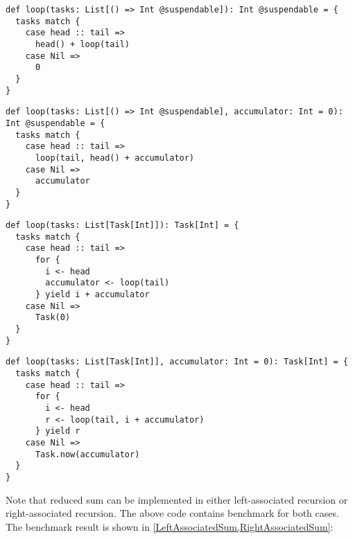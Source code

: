 \begin{lstlisting}[float=htbp,caption={Left-associated sum based on Scala Continuation plug-in},label={LeftAssociatedSum.scalaContinuation}]
def loop(tasks: List[() => Int @suspendable]): Int @suspendable = {
  tasks match {
    case head :: tail =>
      head() + loop(tail)
    case Nil =>
      0
  }
}
\end{lstlisting}

\begin{lstlisting}[float=htbp,caption={Right-associated sum based on Scala Continuation plug-in},label={RightAssociatedSum.scalaContinuation}]
def loop(tasks: List[() => Int @suspendable], accumulator: Int = 0): Int @suspendable = {
  tasks match {
    case head :: tail =>
      loop(tail, head() + accumulator)
    case Nil =>
      accumulator
  }
}
\end{lstlisting}

\begin{lstlisting}[float=htbp,caption={Left-associated sum based on \lstinline{for}-comprehension},label={LeftAssociatedSum.scalaz}]
def loop(tasks: List[Task[Int]]): Task[Int] = {
  tasks match {
    case head :: tail =>
      for {
        i <- head
        accumulator <- loop(tail)
      } yield i + accumulator
    case Nil =>
      Task(0)
  }
}
\end{lstlisting}

\begin{lstlisting}[float=htbp,caption={Right-associated sum based on \lstinline{for}-comprehension},label={RightAssociatedSum.scalaz}]
def loop(tasks: List[Task[Int]], accumulator: Int = 0): Task[Int] = {
  tasks match {
    case head :: tail =>
      for {
        i <- head
        r <- loop(tail, i + accumulator)
      } yield r
    case Nil =>
      Task.now(accumulator)
  }
}
\end{lstlisting}

Note that reduced sum can be implemented in either left-associated recursion or right-associated recursion. The above code contains benchmark for both cases. The benchmark result is shown in \cref{LeftAssociatedSum,RightAssociatedSum}:

